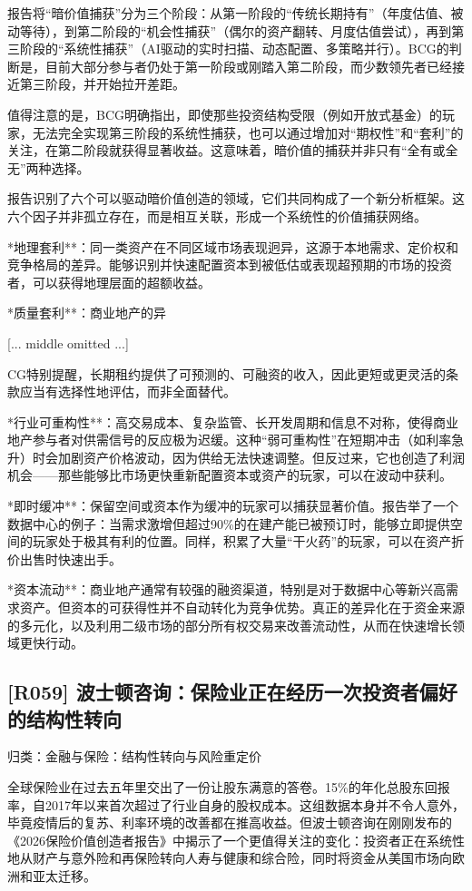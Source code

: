 \documentclass[11pt]{ctexart}
\begin{document}
报告将“暗价值捕获”分为三个阶段：从第一阶段的“传统长期持有”（年度估值、被动等待），到第二阶段的“机会性捕获”（偶尔的资产翻转、月度估值尝试），再到第三阶段的“系统性捕获”（AI驱动的实时扫描、动态配置、多策略并行）。BCG的判断是，目前大部分参与者仍处于第一阶段或刚踏入第二阶段，而少数领先者已经接近第三阶段，并开始拉开差距。

值得注意的是，BCG明确指出，即使那些投资结构受限（例如开放式基金）的玩家，无法完全实现第三阶段的系统性捕获，也可以通过增加对“期权性”和“套利”的关注，在第二阶段就获得显著收益。这意味着，暗价值的捕获并非只有“全有或全无”两种选择。

报告识别了六个可以驱动暗价值创造的领域，它们共同构成了一个新分析框架。这六个因子并非孤立存在，而是相互关联，形成一个系统性的价值捕获网络。

*地理套利**：同一类资产在不同区域市场表现迥异，这源于本地需求、定价权和竞争格局的差异。能够识别并快速配置资本到被低估或表现超预期的市场的投资者，可以获得地理层面的超额收益。

*质量套利**：商业地产的异

[... middle omitted ...]

CG特别提醒，长期租约提供了可预测的、可融资的收入，因此更短或更灵活的条款应当有选择性地评估，而非全面替代。

*行业可重构性**：高交易成本、复杂监管、长开发周期和信息不对称，使得商业地产参与者对供需信号的反应极为迟缓。这种“弱可重构性”在短期冲击（如利率急升）时会加剧资产价格波动，因为供给无法快速调整。但反过来，它也创造了利润机会——那些能够比市场更快重新配置资本或资产的玩家，可以在波动中获利。

*即时缓冲**：保留空间或资本作为缓冲的玩家可以捕获显著价值。报告举了一个数据中心的例子：当需求激增但超过90\%的在建产能已被预订时，能够立即提供空间的玩家处于极其有利的位置。同样，积累了大量“干火药”的玩家，可以在资产折价出售时快速出手。

*资本流动**：商业地产通常有较强的融资渠道，特别是对于数据中心等新兴高需求资产。但资本的可获得性并不自动转化为竞争优势。真正的差异化在于资金来源的多元化，以及利用二级市场的部分所有权交易来改善流动性，从而在快速增长领域更快行动。

\subsection{[R059] 波士顿咨询：保险业正在经历一次投资者偏好的结构性转向}
{\small\color{refgray}归类：金融与保险：结构性转向与风险重定价}

全球保险业在过去五年里交出了一份让股东满意的答卷。15\%的年化总股东回报率，自2017年以来首次超过了行业自身的股权成本。这组数据本身并不令人意外，毕竟疫情后的复苏、利率环境的改善都在推高收益。但波士顿咨询在刚刚发布的《2026保险价值创造者报告》中揭示了一个更值得关注的变化：投资者正在系统性地从财产与意外险和再保险转向人寿与健康和综合险，同时将资金从美国市场向欧洲和亚太迁移。
\end{document}
